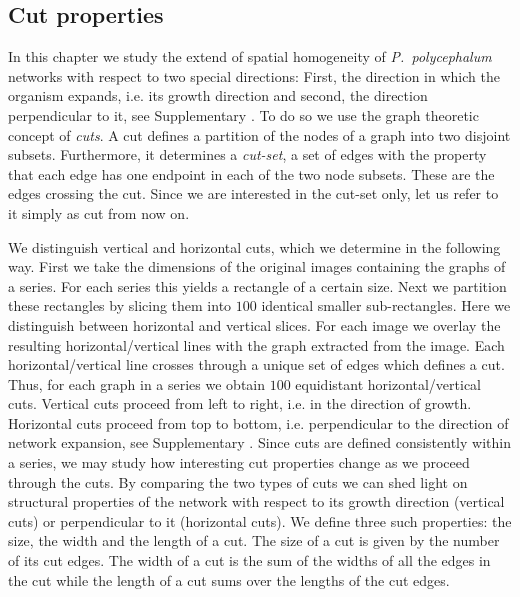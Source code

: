 	\subsection{Cut properties}

		In this chapter we study the extend of spatial homogeneity of \emph{P.~polycephalum} networks with respect to two special directions: First, the direction in which the organism expands, i.e. its growth direction and second, the direction perpendicular to it, see Supplementary . To do so we use the graph theoretic concept of \emph{cuts}. A cut defines a partition of the nodes of a graph into two disjoint subsets. Furthermore, it determines a \emph{cut-set}, a set of edges with the property that each edge has one endpoint in each of the two node subsets. These are the edges crossing the cut. Since we are interested in the cut-set only, let us refer to it simply as cut from now on. 

		We distinguish vertical and horizontal cuts, which we determine in the following way. First we take the dimensions of the original images containing the graphs of a series. For each series this yields a rectangle of a certain size. Next we partition these rectangles by slicing them into $100$ identical smaller sub-rectangles. Here we distinguish between horizontal and vertical slices. For each image we overlay the resulting horizontal/vertical lines with the graph extracted from the image. Each horizontal/vertical line crosses through a unique set of edges which defines a cut. Thus, for each graph in a series we obtain $100$ equidistant horizontal/vertical cuts. Vertical cuts proceed from left to right, i.e. in the direction of growth. Horizontal cuts proceed from top to bottom, i.e. perpendicular to the direction of network expansion, see Supplementary . Since cuts are defined consistently within a series, we may study how interesting cut properties change as we proceed through the cuts. By comparing the two types of cuts we can shed light on structural properties of the network with respect to its growth direction (vertical cuts) or perpendicular to it (horizontal cuts). We define three such properties: the size, the width and the length of a cut. The size of a cut is given by the number of its cut edges. The width of a cut is the sum of the widths of all the edges in the cut while the length of a cut sums over the lengths of the cut edges. 

